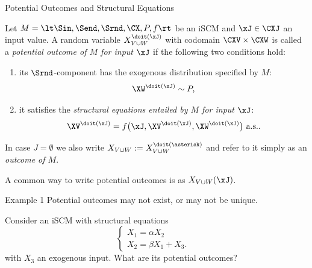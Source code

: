 \begin{frame}{Potential Outcomes and Structural Equations}
\begin{Def}[\ref{def:scm_solutions_for_inputs}]
  Let $M = \lt \Sin, \Send, \Srnd, \CX, P, f \rt$ be an iSCM and $\xJ \in \CXJ$ an input value.
  A random variable $X_{V \cup W}^{\doit(\xJ)}$ with codomain $\CXV \times \CXW$ is called
  a \emph{potential outcome of $M$ for input $\xJ$} 
  if the following two conditions hold:
    \begin{enumerate}
      \item its $\Srnd$-component has the exogenous distribution specified by $M$: 
        $$\XW^{\doit(\xJ)} \sim P,$$
      \item it satisfies the \emph{structural equations entailed by $M$ for input $\xJ$}:
        \begin{equation*}
          \XV^{\doit(\xJ)} = f\big(\xJ, \XV^{\doit(\xJ)}, \XW^{\doit(\xJ)}\big) \text{ a.s.}.
        \end{equation*}
    \end{enumerate}
  In case $J = \emptyset$ we also write $X_{V \cup W} := X_{V \cup W}^{\doit(\asterisk)}$ and refer to it simply as an \emph{outcome of $M$}.
\end{Def}
A common way to write potential outcomes is as $X_{V\cup W}(\xJ)$.
\end{frame}

\begin{frame}[t]{Example 1}
Potential outcomes may not exist, or may not be unique.
\begin{Eg}
Consider an iSCM with structural equations
$$\begin{cases}
  X_1 = \alpha X_2 & \\
  X_2 = \beta X_1 + X_3. &
\end{cases}$$
with $X_3$ an exogenous input. What are its potential outcomes?

\bigskip
{}
\end{Eg}
\end{frame}

